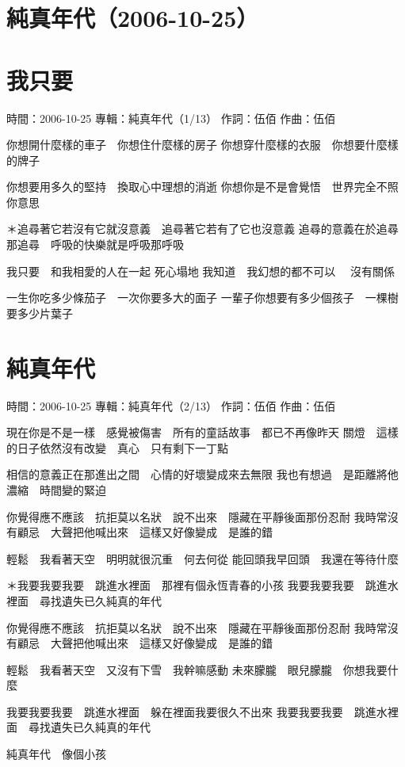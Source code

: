 \documentclass[UTF8,a4paper,oneside,twocolumn,12pt]{ctexbook}
\newcommand{\infopair}[2]{\textbullet #1：#2}
\newcommand{\zc}[1][伍佰]{\infopair{作詞}{#1}}
\newcommand{\zq}[1][伍佰]{\infopair{作曲}{#1}}
\newcommand{\zj}[1]{\infopair{專輯}{#1}}
\newcommand{\sj}[1]{\infopair{時間}{#1}}
\newenvironment{info}{\begin{flushleft}\kaishu
	}
	{\end{flushleft}\normalsize\yahei\par}
\newenvironment{lyric}{
	}
{}
\begin{document}
\section*{純真年代（2006-10-25）}
\section{我只要}
\begin{info}
	\sj{2006-10-25}
	\zj{純真年代（1/13）}
	\zc
	\zq
\end{info}
\begin{lyric}
	你想開什麼樣的車子　你想住什麼樣的房子
	你想穿什麼樣的衣服　你想要什麼樣的牌子

	你想要用多久的堅持　換取心中理想的消逝
	你想你是不是會覺悟　世界完全不照你意思

	＊追尋著它若沒有它就沒意義　追尋著它若有了它也沒意義
	追尋的意義在於追尋那追尋　呼吸的快樂就是呼吸那呼吸

	我只要　和我相愛的人在一起 死心塌地
	我知道　我幻想的都不可以　 沒有關係

	一生你吃多少條茄子　一次你要多大的面子
	一輩子你想要有多少個孩子　一棵樹要多少片葉子
\end{lyric}

\section{純真年代}
\begin{info}
	\sj{2006-10-25}
	\zj{純真年代（2/13）}
	\zc
	\zq
\end{info}
\begin{lyric}
	現在你是不是一樣　感覺被傷害　所有的童話故事　都已不再像昨天
	關燈　這樣的日子依然沒有改變　真心　只有剩下一丁點

	相信的意義正在那進出之間　心情的好壞變成來去無限
	我也有想過　是距離將他濃縮　時間變的緊迫

	你覺得應不應該　抗拒莫以名狀　說不出來　隱藏在平靜後面那份忍耐
	我時常沒有顧忌　大聲把他喊出來　這樣又好像變成　是誰的錯

	輕鬆　我看著天空　明明就很沉重　何去何從
	能回頭我早回頭　我還在等待什麼

	＊我要我要我要　跳進水裡面　那裡有個永恆青春的小孩
	我要我要我要　跳進水裡面　尋找遺失已久純真的年代

	你覺得應不應該　抗拒莫以名狀　說不出來　隱藏在平靜後面那份忍耐
	我時常沒有顧忌　大聲把他喊出來　這樣又好像變成　是誰的錯

	輕鬆　我看著天空　又沒有下雪　我幹嘛感動
	未來朦朧　眼兒朦朧　你想我要什麼

	我要我要我要　跳進水裡面　躲在裡面我要很久不出來
	我要我要我要　跳進水裡面　尋找遺失已久純真的年代

	純真年代　像個小孩
\end{lyric}
\end{document}
